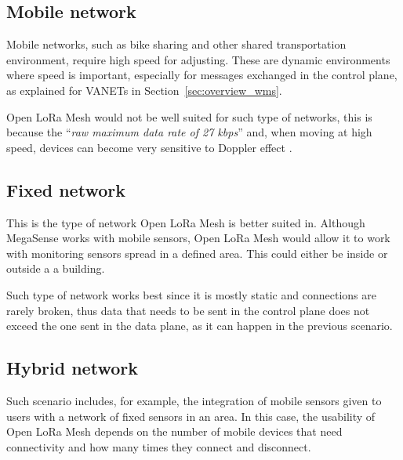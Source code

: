 		\subsection{Mobile network}
		
			Mobile networks, such as bike sharing and other shared transportation environment, require high speed for adjusting. 
			These are dynamic environments where speed is important, especially for messages exchanged in the control plane, as explained for VANETs in Section~\ref{sec:overview_wms}.
			
			Open LoRa Mesh would not be well suited for such type of networks, this is because the ``\textit{raw maximum data rate of 27 kbps}'' \cite{8030482} and, when moving at high speed, devices can become very sensitive to Doppler effect \cite{s21124049}.
		
		\subsection{Fixed network}
		
			This is the type of network Open LoRa Mesh is better suited in.
			Although MegaSense works with mobile sensors, Open LoRa Mesh would allow it to work with monitoring sensors spread in a defined area.
			This could either be inside or outside a a building.
			
			Such type of network works best since it is mostly static and connections are rarely broken, thus data that needs to be sent in the control plane does not exceed the one sent in the data plane, as it can happen in the previous scenario.
		
		\subsection{Hybrid network}
		
			Such scenario includes, for example, the integration of mobile sensors given to users with a network of fixed sensors in an area.
			In this case, the usability of Open LoRa Mesh depends on the number of mobile devices that need connectivity and how many times they connect and disconnect.
			